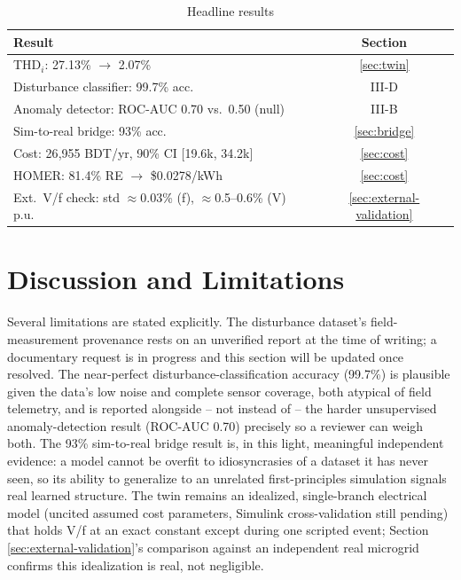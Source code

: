 \documentclass[conference,a4paper]{IEEEtran}
\begin{document}
\begin{table}[H]
\centering
\footnotesize
\caption{Headline results}
\label{tab:summary}
\begin{tabular}{|p{4.6cm}|c|}
\hline
\rowcolor{gray!20}
\textbf{Result} & \textbf{Section} \\
\hline
THD$_i$: 27.13\% $\to$ 2.07\% & \ref{sec:twin} \\
\hline
Disturbance classifier: 99.7\% acc. & III-D \\
\hline
Anomaly detector: ROC-AUC 0.70 vs.\ 0.50 (null) & III-B \\
\hline
Sim-to-real bridge: 93\% acc. & \ref{sec:bridge} \\
\hline
Cost: 26{,}955 BDT/yr, 90\% CI [19.6k, 34.2k] & \ref{sec:cost} \\
\hline
HOMER: 81.4\% RE $\to$ \$0.0278/kWh & \ref{sec:cost} \\
\hline
Ext.\ V/f check: std $\approx$0.03\% (f), $\approx$0.5--0.6\% (V) p.u. & \ref{sec:external-validation} \\
\hline
\end{tabular}
\end{table}

\section{Discussion and Limitations}
\label{sec:limitations}
Several limitations are stated explicitly. The disturbance dataset's
field-measurement provenance rests on an unverified report at the
time of writing; a documentary request is in progress and this
section will be updated once resolved. The near-perfect
disturbance-classification accuracy (99.7\%) is plausible given the
data's low noise and complete sensor coverage, both atypical of field
telemetry, and is reported alongside -- not instead of -- the harder
unsupervised anomaly-detection result (ROC-AUC 0.70) precisely so a
reviewer can weigh both. The 93\% sim-to-real bridge result is, in
this light, meaningful independent evidence: a model cannot be
overfit to idiosyncrasies of a dataset it has never seen, so its
ability to generalize to an unrelated first-principles simulation
signals real learned structure. The twin remains an idealized,
single-branch electrical model (uncited assumed cost parameters,
Simulink cross-validation still pending) that holds V/f at an exact
constant except during one scripted event; Section
\ref{sec:external-validation}'s comparison against an independent
real microgrid confirms this idealization is real, not negligible.
\end{document}
